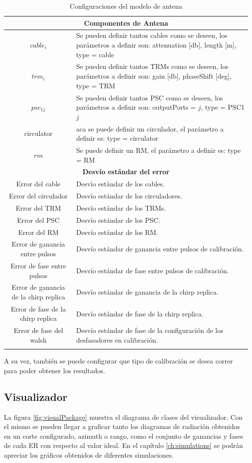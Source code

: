 \begin{center}
\begin{longtable}{|c|p{9cm}|}
	\multicolumn{2}{|c|}{\textbf{Componentes de Antena}} \\
	\hline
	$cable_i$ & Se pueden definir tantos cables como se deseen, los parámetros a definir son: attenuation [db], length [m], type = cable \tabularnewline \hline 
	$trm_i$ & Se pueden definir tantos TRMs como se deseen, los parámetros a definir son: gain [db], phaseShift [deg], type = TRM \tabularnewline \hline 
	$psc_{1j}$ & Se pueden definir tantos PSC como se deseen, los parámetros a definir son: outputPorts = $j$, type = PSC1$j$ \tabularnewline \hline 
	circulator & aca se puede definir un circulador, el parámetro a definir es: type = circulator \tabularnewline \hline 
	$rm$ & Se puede definir un RM, el parámetro a definir es: type = RM \tabularnewline \hline 
	\multicolumn{2}{|c|}{\textbf{Desvío estándar del error}} \\
	\hline
	Error del cable & Desvío estándar de los cables. \tabularnewline \hline 
	Error del circulador & Desvío estándar de los circuladores. \tabularnewline \hline 
	Error del TRM & Desvío estándar de los TRMs. \tabularnewline \hline 
	Error del PSC & Desvío estándar de los PSC. \tabularnewline \hline 
	Error del RM & Desvío estándar de los RM. \tabularnewline \hline 
	Error de ganancia entre pulsos & Desvío estándar de ganancia entre pulsos de calibración. \tabularnewline \hline 
	Error de fase entre pulsos & Desvío estándar de fase entre pulsos de calibración. \tabularnewline \hline 
	Error de ganancia de la chirp replica & Desvío estándar de ganancia de la chirp replica. \tabularnewline \hline 
	Error de fase de la chirp replica & Desvío estándar de fase de la chirp replica. \tabularnewline \hline 
	Error de fase del walsh & Desvío estándar de fase de la configuración de los desfasadores en calibración. \tabularnewline \hline 
	\caption{Configuraciones del modelo de antena}
  \end{longtable}
  \label{tab:conf_modelo_antena}
\end{center}

A su vez, también se puede configurar que tipo de calibración se desea correr para poder obtener los resultados.


\subsection{Visualizador}

La figura \ref{fig:visualPackage} muestra el diagrama de clases del visualizador. Con el mismo se pueden llegar a graficar tanto
los diagramas de radiación obtenidos en un corte configurado, azimuth o rango, como el conjunto de ganancias y fases de cada ER
con respecto al valor ideal. En el capítulo \ref{ch:simulations} se podrán apreciar los gráficos obtenidos de diferentes
simulaciones.

